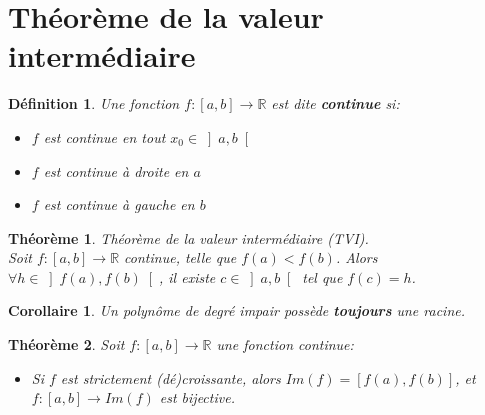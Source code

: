 \documentclass[10pt,a4paper]{book}
\newcommand{\R}{\mathbb{R}}
\newtheorem{theorem}{Théorème}[section]
\newtheorem{definition}{Définition}[section]
\newtheorem{corollaire}{Corollaire}[theorem]
\begin{document}
\section{Théorème de la valeur intermédiaire}

\begin{definition} Une fonction $f: \left[a,b\right] \rightarrow \R$ est dite \textbf{continue} si:
\begin{itemize}
\item $f$ est continue en tout $x_0 \in \left]a,b\right[$
\item $f$ est continue à droite en $a$
\item $f$ est continue à gauche en $b$
\end{itemize}
\end{definition}

\begin{theorem} \label{thm:TVI}
Théorème de la valeur intermédiaire (TVI). \\
Soit $f: \left[a,b\right] \rightarrow \R$ continue, telle que $f(a) < f(b)$. Alors $\forall h \in \left]f(a),f(b)\right[$, il existe $c \in \left]a,b\right[$ tel que $f(c) = h$.
\end{theorem}

\begin{corollaire}
Un polynôme de degré impair possède \textbf{toujours} une racine.
\end{corollaire}

\begin{theorem}
Soit $f: \left[a,b\right] \rightarrow \R$ une fonction continue:
\begin{itemize}
\item Si $f$ est strictement (dé)croissante, alors $Im(f) = \left[f(a),f(b)\right]$, et $f: \left[a,b\right] \rightarrow Im(f)$ est bijective.
\end{itemize}
\end{theorem}
\end{document}
